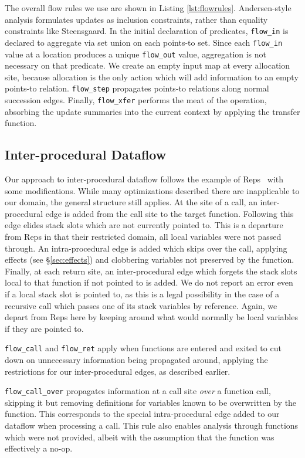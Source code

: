 The overall flow rules we use are shown in  Listing \ref{lst:flowrules}.
Andersen-style analysis formulates updates as inclusion constraints, rather than equality constraints like Steensgaard.
In the initial declaration of predicates, \texttt{flow\_in} is declared to aggregate via set union on each points-to set.
Since each \texttt{flow\_in} value at a location produces a unique \texttt{flow\_out} value, aggregation is not necessary on that predicate.
We create an empty input map at every allocation site, because allocation is the only action which will add information to an empty points-to relation.
\texttt{flow\_step} propagates points-to relations along normal succession edges.
Finally, \texttt{flow\_xfer} performs the meat of the operation, absorbing the update summaries into the current context by applying the transfer function.

\subsection{Inter-procedural Dataflow}
\label{sec:interproc}
Our approach to inter-procedural dataflow follows the example of Reps~\cite{interproc-dataflow} with some modifications.
While many optimizations described there are inapplicable to our domain, the general structure still applies.
At the site of a call, an inter-procedural edge is added from the call site to the target function.
Following this edge elides stack slots which are not currently pointed to.
This is a departure from Reps in that their restricted domain, all local variables were not passed through.
An intra-procedural edge is added which skips over the call, applying effects (see \S \ref{sec:effects}) and clobbering variables not preserved by the function.
Finally, at each return site, an inter-procedural edge which forgets the stack slots local to that function if not pointed to is added.
We do not report an error even if a local stack slot is pointed to, as this is a legal possibility in the case of a recursive call which passes one of its stack variables by reference.
Again, we depart from Reps here by keeping around what would normally be local variables if they are pointed to.

\texttt{flow\_call} and \texttt{flow\_ret} apply when functions are entered and exited to cut down on unnecessary information being propagated around, applying the restrictions for our inter-procedural edges, as described earlier.

\texttt{flow\_call\_over} propagates information at a call site \emph{over} a function call, skipping it but removing definitions for variables known to be overwritten by the function.
This corresponds to the special intra-procedural edge added to our dataflow when processing a call.
This rule also enables analysis through functions which were not provided, albeit with the assumption that the function was effectively a no-op.

